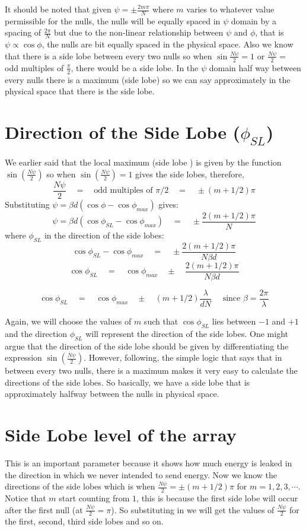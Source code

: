 It should be noted that given $\psi = \pm \frac{2m\pi}{N}$ where $m$ varies to whatever value permissible for the nulls, the nulls will be equally spaced in  $\psi$ domain by a spacing of $\frac{2\pi}{N}$ but due to the non-linear relationship between $\psi$ and $\phi$, that is $\psi \propto \cos{\phi}$, the nulls are bit equally spaced in the physical space. Also we know that there is a side lobe between every two nulls so when $\sin{\frac{N\psi}{2}} = 1$ or $\frac{N\psi}{2} = $ odd multiples of $\frac{\pi}{2}$, there would be a side lobe. In the $\psi$ domain half way between every nulls there is a maximum (side lobe) so we can say approximately in the physical space that there is the side lobe.


\section{Direction of the Side Lobe ($\phi_{SL}$)}
We earlier said that the local maximum (side lobe ) is given by the function $\sin{(\frac{N\psi}{2})}$ so when $\sin{(\frac{N\psi}{2})} = 1$ gives the side lobes, therefore, 
$$ \frac{N\psi}{2} \quad = \quad \text{odd multiples of $\pi/2$} \quad = \quad \pm (m + 1/2) \pi $$
Substituting $ \psi = \beta d (\cos\phi - \cos\phi_{max}) $ gives:
$$ \psi = \beta d (\cos\phi_{SL} - \cos\phi_{max}) \quad= \quad \pm \frac{2(m + 1/2) \pi}{N}$$
where $\phi_{SL}$ in the direction of the side lobes:
$$ \cos\phi_{SL} - \cos\phi_{max} \quad= \quad \pm \frac{2(m + 1/2) \pi}{N \beta d} $$
$$ \cos\phi_{SL} \quad= \quad  \cos\phi_{max}  \quad \pm \quad \frac{2(m + 1/2) \pi}{N \beta d} $$

$$ \cos\phi_{SL} \quad= \quad  \cos\phi_{max}  \quad \pm \quad (m + 1/2) \frac{\lambda}{dN} \quad \text{ since $\beta=\frac{2\pi}{\lambda}$} $$

Again, we will choose the values of $m$ such that $\cos\phi_{SL}$ lies between $-1$ and $+1$ and the direction $\phi_{SL}$ will represent the direction of the side lobes. One might argue that the direction of the side lobe should be given by differentiating the expression $\sin{(\frac{N\psi}{2})}$. However, following, the simple logic that says that in between every two nulls, there is a maximum makes it very easy to calculate the directions of the side lobes. So basically, we have a side lobe that is approximately halfway between the nulls in physical space.

\section{Side Lobe level of the array}
This is an important parameter because it shows how much energy is leaked in the direction in which we never intended to send energy. Now we know the directions of the side lobes which is when $\frac{N\psi}{2} = \pm (m + 1/2) \pi $ for $m=1,2,3,\cdots$. Notice that $m$ start counting from $1$, this is because the first side lobe will occur after the first null  (at $\frac{N\psi}{2} = \pi$). So substituting in %
we will get the values of $\frac{N\psi}{2}$ for the first, second, third side lobes and so on.\\

